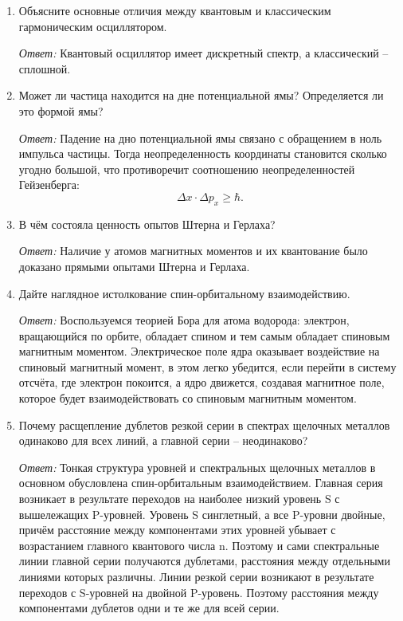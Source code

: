 \begin{enumerate}
\vspace*{1.5em}

\item Объясните основные отличия между квантовым и классическим гармоническим
осциллятором.

\emph{Ответ:}
Квантовый осциллятор имеет дискретный спектр, а классический -- сплошной.

\vspace*{1.5em}
\item Может ли частица находится на дне потенциальной ямы? Определяется ли это
формой ямы?

\emph{Ответ:}
Падение на дно потенциальной ямы связано с обращением в ноль импульса частицы.
Тогда неопределенность координаты становится сколько угодно большой, что
противоречит соотношению неопределенностей Гейзенберга:
\[
    \Delta x \cdot \Delta p_x \ge \hbar.
\]

\vspace*{1.5em}
\item В чём состояла ценность опытов Штерна и Герлаха?

\emph{Ответ:}
Наличие у атомов магнитных моментов и их квантование было доказано прямыми
опытами Штерна и Герлаха.

\vspace*{1.5em}
\item Дайте наглядное истолкование спин-орбитальному взаимодействию.

\emph{Ответ:}
Воспользуемся теорией Бора для атома водорода: электрон, вращающийся по орбите,
обладает спином и тем самым обладает спиновым магнитным моментом. Электрическое
поле ядра оказывает воздействие на спиновый магнитный момент, в этом легко
убедится, если перейти в систему отсчёта, где электрон покоится, а ядро
движется, создавая магнитное поле, которое будет взаимодействовать со спиновым
магнитным моментом.

\vspace*{1.5em}
\item Почему расщепление дублетов резкой серии в спектрах щелочных металлов
одинаково для всех линий, а главной серии -- неодинаково?

\emph{Ответ:}
Тонкая структура уровней и спектральных щелочных металлов в основном обусловлена
спин-орбитальным взаимодействием. Главная серия возникает в результате переходов
на наиболее низкий уровень S с вышележащих P-уровней. Уровень S синглетный, а
все P-уровни двойные, причём расстояние между компонентами этих уровней убывает
с возрастанием главного квантового числа n. Поэтому и сами спектральные линии
главной серии получаются дублетами, расстояния между отдельными линиями которых
различны. Линии резкой серии возникают в результате переходов с S-уровней на
двойной P-уровень. Поэтому расстояния между компонентами дублетов одни и те же
для всей серии.


\end{enumerate}

